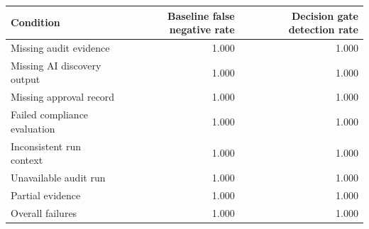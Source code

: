 \begin{tabular}{lrr}
\toprule
Condition & Baseline false negative rate & Decision gate detection rate \\
\midrule
Missing audit evidence & 1.000 & 1.000 \\
Missing AI discovery output & 1.000 & 1.000 \\
Missing approval record & 1.000 & 1.000 \\
Failed compliance evaluation & 1.000 & 1.000 \\
Inconsistent run context & 1.000 & 1.000 \\
Unavailable audit run & 1.000 & 1.000 \\
Partial evidence & 1.000 & 1.000 \\
\midrule
Overall failures & 1.000 & 1.000 \\
\bottomrule
\end{tabular}
